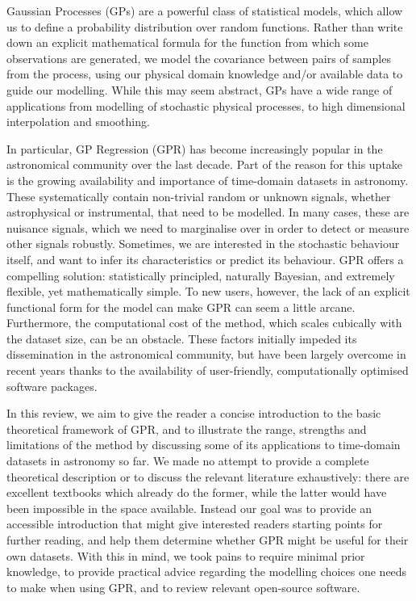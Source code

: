 \documentclass[letterpaper]{ar-1col}
\begin{document}
Gaussian Processes (GPs) are a powerful class of statistical models, which allow us to define a probability distribution over random functions. Rather than write down an explicit mathematical formula for the function from which some observations are generated, we model the covariance between pairs of samples from the process, using our physical domain knowledge and/or available data to guide our modelling.
While this may seem abstract, GPs have a wide range of applications from modelling of stochastic physical processes, to high dimensional interpolation and smoothing.
\begin{armarginnote}[]
\end{armarginnote}
In particular, GP Regression (GPR) has become increasingly popular in the astronomical community over the last decade. Part of the reason for this uptake is the growing availability and importance of time-domain datasets in astronomy. These systematically contain non-trivial random or unknown signals, whether astrophysical or instrumental, that need to be modelled. In many cases, these are nuisance signals, which we need to marginalise over in order to detect or measure other signals robustly. Sometimes, we are interested in the stochastic behaviour itself, and want to infer its characteristics or predict its behaviour. GPR offers a compelling solution: statistically principled, naturally Bayesian, and extremely flexible, yet mathematically simple. To new users, however, the lack of an explicit functional form for the model can make GPR can seem a little arcane. Furthermore, the computational cost of the method, which scales cubically with the dataset size, can be an obstacle. These factors initially impeded its dissemination in the astronomical community, but have been largely overcome in recent years thanks to the availability of user-friendly, computationally optimised software packages.

In this review, we aim to give the reader a concise introduction to the basic theoretical framework of GPR, and to illustrate the range, strengths and limitations of the method by discussing some of its applications to time-domain datasets in astronomy so far. We made no attempt to provide a complete theoretical description or to discuss the relevant literature exhaustively: there are excellent textbooks which already do the former, while the latter would have been impossible in the space available. Instead our goal was to provide an accessible introduction that might give interested readers starting points for further reading, and help them determine whether GPR might be useful for their own datasets. With this in mind, we took pains to require minimal prior knowledge, to provide practical advice regarding the modelling choices one needs to make when using GPR, and to review relevant open-source software.
\end{document}
